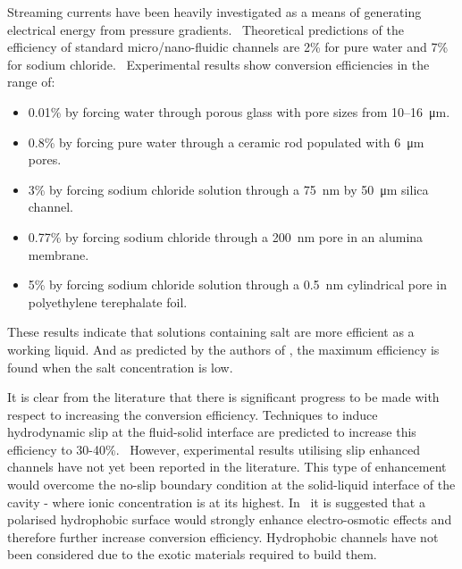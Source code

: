 \documentclass[10pt,final,journal]{IEEEtran}
\begin{document}
    Streaming currents have been heavily investigated as a means of generating electrical energy from pressure gradients.~\cite{Chang2009,Daiguji2006,Daiguji2004b,Davidson2008a,Davidson2008,CherngHon2012,Jiao2014,Lu2006,Olthuis2005,Osterle1964,Pennathur2007,Ren2008a,VanderHeyden2006,Heyden2007,Xie2008,Yang2003}
    Theoretical predictions of the efficiency of standard micro/nano-fluidic channels are 2\% for pure water and 7\% for sodium chloride.~\cite{VanderHeyden2006}
    Experimental results show conversion efficiencies in the range of:
    \begin{itemize}
        \item 0.01\% by forcing water through porous glass with pore sizes from 10\thinspace--\SI{16}{\micro\metre}.~\cite{Yang2003}
        \item 0.8\% by forcing pure water through a ceramic rod populated with \SI{6}{\micro\metre} pores.~\cite{Yang2004}
        \item 3\% by forcing sodium chloride solution through a \SI{75}{\nano\metre} by \SI{50}{\micro\metre} silica channel.~\cite{Heyden2007}
        \item 0.77\% by forcing sodium chloride through a \SI{200}{\nano\metre} pore in an alumina membrane.~\cite{Lu2006}
        \item 5\% by forcing sodium chloride solution through a \SI{0.5}{\nano\metre} cylindrical pore in polyethylene terephalate foil.~\cite{Xie2008}
    \end{itemize}
    These results indicate that solutions containing salt are more efficient as a working liquid.
    And as predicted by the authors of \cite{VanderHeyden2006}, the maximum efficiency is found when the salt concentration is low.

    It is clear from the literature that there is significant progress to be made with respect to increasing the conversion efficiency.
    Techniques to induce hydrodynamic slip at the fluid-solid interface are predicted to increase this efficiency to 30-40\%.~\cite{Davidson2008a, Ren2008a}
    However, experimental results utilising slip enhanced channels have not yet been reported in the literature.
    This type of enhancement would overcome the no-slip boundary condition at the solid-liquid interface of the cavity - where ionic concentration is at its highest.
    In~\cite{Joly2006} it is suggested that a polarised hydrophobic surface would strongly enhance electro-osmotic effects and therefore further increase conversion efficiency.
    Hydrophobic channels have not been considered due to the exotic materials required to build them.
\end{document}
